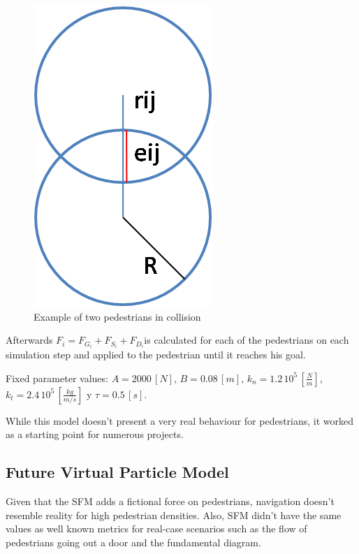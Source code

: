 \documentclass[english]{article}
\numberwithin{equation}{section}
\numberwithin{figure}{section}
\begin{document}
\begin{figure}[H]
\begin{centering}
\includegraphics[scale=0.4]{pics/sfm/ganular}
\par\end{centering}

\protect\caption{Example of two pedestrians in collision}


\end{figure}


\vspace{1cm}


Afterwards $F_{i}=F_{G_{i}}+F_{S_{i}}+F_{D_{i}}$is calculated for
each of the pedestrians on each simulation step and applied to the
pedestrian until it reaches his goal.

Fixed parameter values: $A=2000\,[N]$, $B=0.08\,[m]$, $k_{n}=1.2\,10^{5}\,[\frac{N}{m}]$,
$k_{t}=2.4\,10^{5}\,[\frac{kg}{m/s}]$ y $\tau=0.5\,[s]$.

While this model doesn't present a very real behaviour for pedestrians,
it worked as a starting point for numerous projects.


\subsection{Future Virtual Particle Model}

Given that the SFM adds a fictional force on pedestrians, navigation doesn't resemble reality for high pedestrian densities.
Also, SFM didn't have the same values as well known metrics for real-case scenarios such as the flow of pedestrians going out a door and the fundamental diagram.
\end{document}
